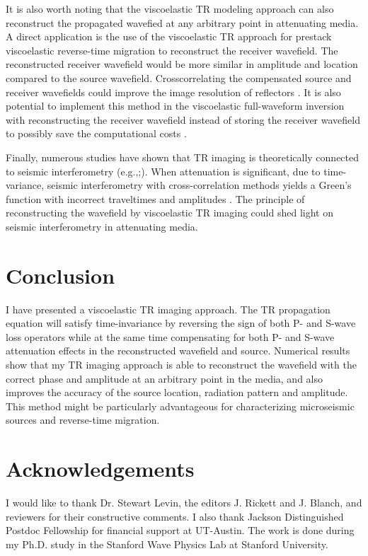 It is also worth noting that the viscoelastic TR modeling approach can also reconstruct the propagated wavefied at any arbitrary point in attenuating media. A direct application is the use of the viscoelastic TR approach for prestack viscoelastic reverse-time migration to reconstruct the receiver wavefield. The reconstructed receiver wavefield would be more similar in amplitude and location compared to the source wavefield. Crosscorrelating the compensated source and receiver wavefields could improve the image resolution of reflectors \cite[]{zhang10,zhu14d}. It is also potential to implement this method in the viscoelastic full-waveform inversion with reconstructing the receiver wavefield instead of storing the receiver wavefield to possibly save the computational costs \cite[]{tarantola88,blanch95b}.

Finally, numerous studies have shown that TR imaging is theoretically connected to seismic interferometry (e.g.,\citealp{derode03b};\citealp{baku06}). When attenuation is significant, due to time-variance, seismic interferometry with cross-correlation methods yields a Green’s function with incorrect traveltimes and amplitudes \cite[]{snieder07}. The principle of reconstructing the wavefield by viscoelastic TR imaging could shed light on seismic interferometry in attenuating media.

\section{Conclusion}
I have presented a viscoelastic TR imaging approach. The TR propagation equation will satisfy time-invariance by reversing the sign of both P- and S-wave loss operators while at the same time compensating for both P- and S-wave attenuation effects in the reconstructed wavefield and source. Numerical results show that my TR imaging approach is able to reconstruct the wavefield with the correct phase and amplitude at an arbitrary point in the media, and also improves the accuracy of the source location, radiation pattern and amplitude. This method might be particularly advantageous for characterizing microseismic sources and reverse-time migration. 

\section{Acknowledgements}
I would like to thank Dr. Stewart Levin, the editors J. Rickett and J. Blanch, and reviewers for their constructive comments. I also thank Jackson Distinguished Postdoc Fellowship for financial support at UT-Austin. The work is done during my Ph.D. study in the Stanford Wave Physics Lab at Stanford University. 

\newpage



